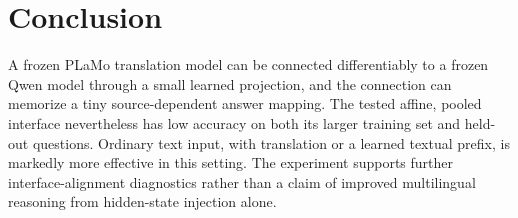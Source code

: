 \section{Conclusion}

A frozen PLaMo translation model can be connected differentiably to a frozen
Qwen model through a small learned projection, and the connection can memorize
a tiny source-dependent answer mapping.
The tested affine, pooled interface nevertheless has low accuracy on both its
larger training set and held-out questions.
Ordinary text input, with translation or a learned textual prefix, is markedly
more effective in this setting.
The experiment supports further interface-alignment diagnostics rather than a
claim of improved multilingual reasoning from hidden-state injection alone.
